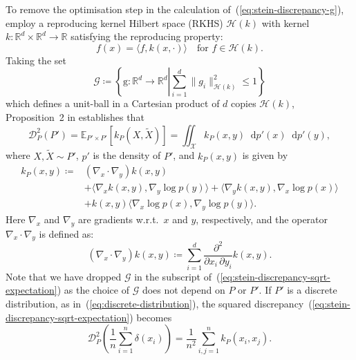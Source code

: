 \documentclass[11pt,a4paper]{report}
\newcommand*\diff{\mathop{}\!\mathrm{d}}
\begin{document}
To remove the optimisation step in the calculation of~(\ref{eq:stein-discrepancy-g}), \cite{gorhamMeasuringSampleQuality2017} employ a reproducing kernel Hilbert space (RKHS) $\mathcal{H}(k)$ with kernel $k: \mathbb{R}^d \times \mathbb{R}^d \to \mathbb{R}$ satisfying the reproducing property:
$$f(x) = \langle f, k(x, \cdot)\rangle \quad\text{for } f \in \mathcal{H}(k).$$
Taking the set
\begin{equation}
\mathcal{G} \coloneq \left\{ \mathrm{g} : \mathbb{R}^d \to \mathbb{R}^d \left| \sum_{i=1}^d \|g_i\|^2_{\mathcal{H}(k)} \leq 1 \right.\right\}
\label{eq:unit-ball}
\end{equation}
which defines a unit-ball in a Cartesian product of $d$ copies $\mathcal{H}(k)$, Proposition~2 in \cite{gorhamMeasuringSampleQuality2017} establishes that
\begin{equation}
\mathcal{D}_{P}^2(P') = \mathbb{E}_{P' \times P'}[k_P(X, \tilde{X})] = \iint_\mathcal{X} k_P(x, y) \diff p'(x) \diff p'(y),
\label{eq:stein-discrepancy-sqrt-expectation}
\end{equation}
where $X, \tilde{X} \sim P'$, $p'$ is the density of $P'$, and $k_P(x, y)$ is given by
\begin{equation}
\begin{aligned}
k_P(x, y) \coloneq 
&(\nabla_x\cdot\nabla_y) k(x,y) \\
&+ \langle \nabla_x k(x, y), \nabla_y \log p(y) \rangle + \langle \nabla_y k(x, y), \nabla_x \log p(x) \rangle \\
&+ k(x, y) \langle \nabla_x \log p(x), \nabla_y \log p(y) \rangle.
\label{eq:deriv:stein-kernel}
\end{aligned}
\end{equation}
Here $\nabla_x$ and $\nabla_y$ are gradients w.r.t.\ $x$ and $y$, respectively, and the operator $\nabla_x\cdot\nabla_y$ is defined as:
$$(\nabla_x\cdot\nabla_y) k(x,y) \coloneq \sum_{i=1}^d \frac{\partial^2}{\partial x_i\, \partial y_i} k(x, y).$$
Note that we have dropped $\mathcal{G}$ in the subscript of~(\ref{eq:stein-discrepancy-sqrt-expectation}) as the choice of $\mathcal{G}$ does not depend on $P$ or $P'$.
If $P'$ is a discrete distribution, as in~(\ref{eq:discrete-distribution}), the squared discrepancy~(\ref{eq:stein-discrepancy-sqrt-expectation}) becomes
\begin{equation}
\mathcal{D}_{P}^2\left(\frac{1}{n} \sum_{i=1}^n \delta(x_i)\right) = \frac{1}{n^2} \sum_{i,j=1}^n k_P(x_i, x_j).
\label{eq:ksd:discrete}
\end{equation}
\end{document}
